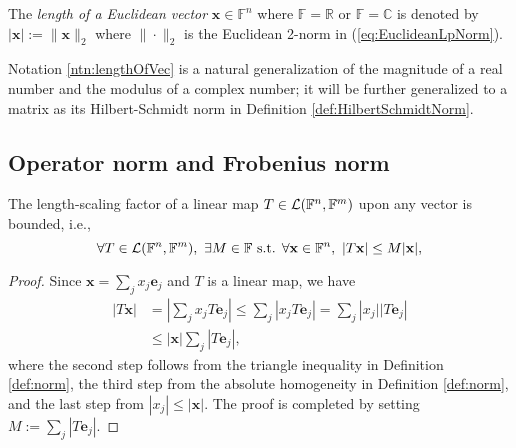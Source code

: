 \begin{ntn}
  \label{ntn:lengthOfVec}
  The \emph{length of a Euclidean vector}
  $\mathbf{x}\in \mathbb{F}^n$
  where $\mathbb{F}=\mathbb{R}$ or $\mathbb{F}=\mathbb{C}$
  is denoted by $|\mathbf{x}|:=\|\mathbf{x}\|_2$
  where $\|\cdot\|_2$ is
  the Euclidean 2-norm in (\ref{eq:EuclideanLpNorm}).
\end{ntn}

\begin{rem}
  Notation \ref{ntn:lengthOfVec} is a natural generalization
  of the magnitude of a real number and the modulus of a complex number;
  it will be further generalized to a matrix as its Hilbert-Schmidt norm
  in Definition \ref{def:HilbertSchmidtNorm}.
\end{rem}


\subsection{Operator norm and Frobenius norm}
\label{sec:operator-norm}

\begin{lem}
  \label{lem:linearOperatorBounded}
  The length-scaling factor of a linear map
  \mbox{$T\in {\cal L}(\mathbb{F}^n,\mathbb{F}^m)$}
  upon any vector is bounded, i.e., 
  \begin{equation}
    \label{eq:linearOperatorBounded}
    \forall T\in {\cal L}(\mathbb{F}^n,\mathbb{F}^m),\ 
    \exists M\in \mathbb{F} \text{ s.t. }
    \forall \mathbf{x}\in \mathbb{F}^n,\
    |T\mathbf{x}|\le M|\mathbf{x}|,
  \end{equation}
\end{lem}
\begin{proof}
  Since $\mathbf{x}=\sum_j x_j\mathbf{e}_j$
  and $T$ is a linear map, we have
  \begin{displaymath}
    \begin{array}{rl}
    |T\mathbf{x}| &= \left|\sum_j x_j T \mathbf{e}_j\right|
                    \le \sum_j \left| x_j T \mathbf{e}_j\right|
                    = \sum_j \left| x_j||T \mathbf{e}_j\right|
    \\
    &\le  |\mathbf{x}| \sum_j\left|T \mathbf{e}_j\right|, 
    \end{array}
  \end{displaymath}
  where the second step follows from the triangle inequality
  in Definition \ref{def:norm}, 
  the third step from the absolute homogeneity 
  in Definition \ref{def:norm}, 
  and the last step from $|x_j|\le |\mathbf{x}|$.
  The proof is completed by setting
  $M:=\sum_j\left|T \mathbf{e}_j\right|$.
\end{proof}

